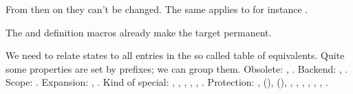 \starttyping
\immutable{}
\stoptyping

From then on they can't be changed. The same applies to for instance \type
{\countdef}.

The \type {\newinteger} and \type {\newcount} definition macros already
make the target permanent.

\stoptitle

\starttitle[title=Impact on engine]

\startitemize
\startitem
    We need to relate states to all entries in the so called table of
    equivalents.
\stopitem
\startitem
    Quite some properties are set by prefixes; we can group them.
\stopitem
\startitem
    Obsolete: \typ {\long}, \typ {\outer}.
\stopitem
\startitem
    Backend:  , \typ {\immediate}.
\stopitem
\startitem
    Scope: \typ {\global}.
\stopitem
\startitem
    Expansion: \typ {\protected}, \typ {\semiprotected}.
\stopitem
\startitem
    Kind of special: \typ {\noaligned}, \typ {\untraced}, \typ {\constrained},
    \typ {\retained}, \typ {\tolerant}, \typ{\constant}.
\stopitem
\startitem
    Protection: \typ {\aliased}, (\typ {\always}), (\typ {\enforced}), \typ
    {\frozen}, \typ {\immutable}, \typ {\inherited}, \typ {\instance}, \typ
    {\mutable}, \typ {\overloaded}, \typ {\permanent}.
\stopitem

\stopitemize

\stoptitle

\starttitle[title=Candidates for protection]

